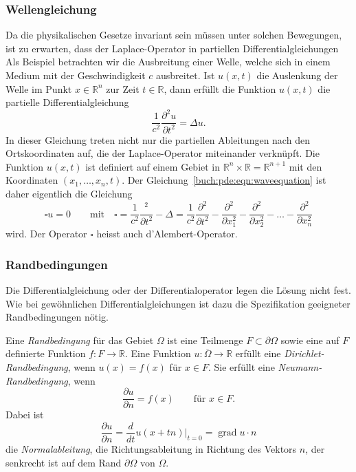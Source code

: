 \subsubsection{Wellengleichung}
Da die physikalischen Gesetze invariant sein müssen unter solchen
Bewegungen, ist zu erwarten, dass der Laplace-Operator in partiellen
Differentialgleichungen 
Als Beispiel betrachten wir die Ausbreitung einer Welle, welche sich
in einem Medium mit der Geschwindigkeit $c$ ausbreitet.
Ist $u(x,t)$ die Auslenkung der Welle im Punkt $x\in\mathbb{R}^n$
zur Zeit $t\in\mathbb{R}$, dann erfüllt die Funktion $u(x,t)$
die partielle Differentialgleichung
\begin{equation}
\frac{1}{c^2}
\frac{\partial^2 u}{\partial t^2}
=
\Delta u.
\label{buch:pde:eqn:waveequation}
\end{equation}
In dieser Gleichung treten nicht nur die partiellen Ableitungen
nach den Ortskoordinaten auf, die der Laplace-Operator miteinander
verknüpft.
Die Funktion $u(x,t)$ ist definiert auf einem Gebiet in 
$\mathbb{R}^{n}\times\mathbb{R}=\mathbb{R}^{n+1}$ mit den Koordinaten
$(x_1,\dots,x_n,t)$.
Der Gleichung~\eqref{buch:pde:eqn:waveequation} ist daher eigentlich
die Gleichung
\[
\square u = 0
\qquad\text{mit}\quad
\square
=
\frac{1}{c^2}\frac{^2}{\partial t^2}
-
\Delta
=
\frac{1}{c^2}\frac{\partial^2}{\partial t^2}
-
\frac{\partial^2}{\partial x_1^2}
-
\frac{\partial^2}{\partial x_2^2}
-\dots- 
\frac{\partial^2}{\partial x_n^2}
\]
wird.
Der Operator $\square$ heisst auch d'Alembert-Operator.
%

%
%
\subsubsection{Randbedingungen}
Die Differentialgleichung oder der Differentialoperator legen die
Lösung nicht fest.
Wie bei gewöhnlichen Differentialgleichungen ist dazu die Spezifikation
geeigneter Randbedingungen nötig.

\begin{definition}
\label{buch:pde:definition:randbedingungen}
Eine {\em Randbedingung} für das Gebiet $\Omega$ ist eine Teilmenge
$F\subset\partial\Omega$ sowie eine auf $F$ definierte Funktion
$f\colon F\to\mathbb{R}$.
Eine Funktion $u\colon \overline{\Omega} \to\mathbb{R}$ erfüllt eine
{\em Dirichlet-Randbedingung}, wenn
%
%
\(
u(x) = f(x)
\)
für $x\in F$.
Sie erfüllt eine {\em Neumann-Randbedingung}, wenn
%
%
\[
\frac{\partial u}{\partial n}
=
f(x)\qquad\text{für $x\in F$}.
\]
Dabei ist
\[
\frac{\partial u}{\partial n}
=
\frac{d}{dt}
u(x+tn)
\bigg|_{t=0}
=
\operatorname{grad}u\cdot n
\]
%
die {\em Normalableitung}, die Richtungsableitung in Richtung des
Vektors $n$, der senkrecht ist auf dem Rand $\partial\Omega$ von
$\Omega$.
\end{definition}

